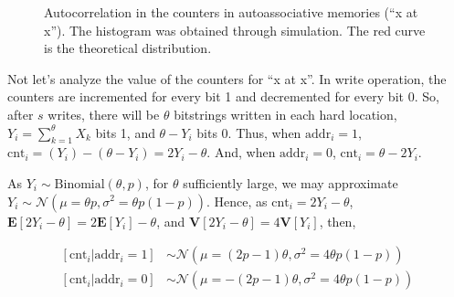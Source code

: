 \documentclass[12pt]{article}
\begin{document}
\begin{figure}[h!]
  \centering

  \caption{Autocorrelation in the counters in autoassociative memories (``x at x''). The histogram was obtained through simulation. The red curve is the theoretical distribution.}
  \label{fig:sdm-corr-prob}
\end{figure}


Not let's analyze the value of the counters for ``x at x''. In write operation, the counters are incremented for every bit 1 and decremented for every bit 0. So, after $s$ writes, there will be $\theta$ bitstrings written in each hard location, $Y_i = \sum_{k=1}^{\theta} X_k$ bits 1, and $\theta - Y_i$ bits 0. Thus, when $\text{addr}_i = 1$, $\text{cnt}_i = (Y_i) - (\theta - Y_i) = 2Y_i - \theta$. And, when $\text{addr}_i = 0$, $\text{cnt}_i = \theta - 2Y_i$.

As $Y_i \sim \text{Binomial}(\theta, p)$, for $\theta$ sufficiently large, we may approximate $Y_i \sim \mathcal{N}(\mu = \theta p, \sigma^2 = \theta p (1-p))$. Hence, as $\text{cnt}_i = 2Y_i - \theta$, $\mathbf{E}[2Y_i - \theta] = 2 \mathbf{E}[Y_i] - \theta$, and $\mathbf{V}[2Y_i - \theta] = 4 \mathbf{V}[Y_i]$, then,

\begin{align}
\left[ \text{cnt}_i | \text{addr}_i=1 \right] &\sim \mathcal{N}(\mu = (2p-1) \theta, \sigma^2 = 4 \theta p (1-p)) \\
\left[ \text{cnt}_i | \text{addr}_i=0 \right] &\sim \mathcal{N}(\mu = -(2p-1) \theta, \sigma^2 = 4 \theta p (1-p))
\end{align}
\end{document}
